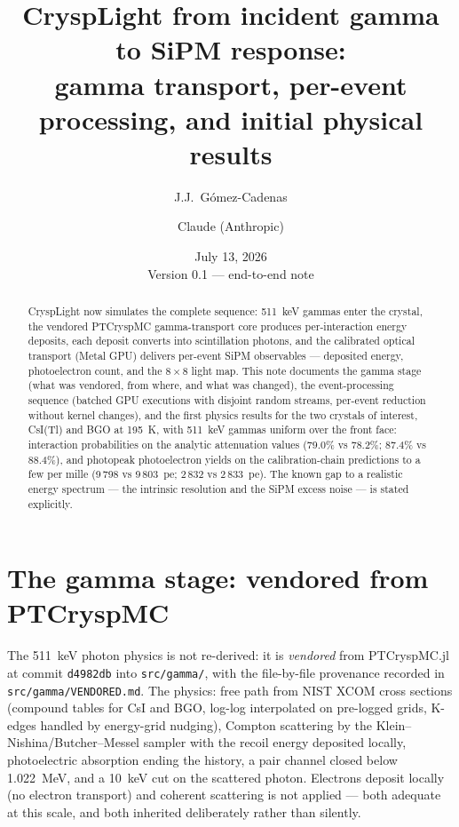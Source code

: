\documentclass[11pt,a4paper]{article}
\title{CryspLight from incident gamma to SiPM response:\\
\large gamma transport, per-event processing, and initial physical results}
\author{J.J.~G\'omez-Cadenas \and Claude (Anthropic)}
\date{July 13, 2026 \\[2mm] \small Version 0.1 --- end-to-end note}
\newcommand{\code}[1]{\texttt{#1}}
\newcommand{\csitl}{CsI(Tl)}
\begin{document}
\maketitle

\begin{abstract}
CryspLight now simulates the complete sequence: 511~keV gammas enter the crystal, the vendored
PTCryspMC gamma-transport core produces per-interaction energy deposits, each deposit
converts into scintillation photons, and the calibrated optical transport (Metal GPU)
delivers per-event SiPM observables --- deposited energy, photoelectron count, and the
$8\times8$ light map. This note documents the gamma stage (what was vendored, from
where, and what was changed), the event-processing sequence (batched GPU executions with
disjoint random streams, per-event reduction without kernel changes), and the first
physics results for the two crystals of interest, \csitl{} and BGO at 195~K, with 511~keV
gammas uniform over the front face: interaction probabilities on the analytic
attenuation values (79.0\% vs 78.2\%; 87.4\% vs 88.4\%), and photopeak photoelectron
yields on the calibration-chain predictions to a few per mille (9\,798 vs 9\,803~pe;
2\,832 vs 2\,833~pe). The known gap to a realistic energy spectrum --- the intrinsic
resolution and the SiPM excess noise --- is stated explicitly.
\end{abstract}

\tableofcontents

\section{The gamma stage: vendored from PTCryspMC}

The 511~keV photon physics is not re-derived: it is \emph{vendored} from
PTCryspMC.jl at commit \code{d4982db} into \code{src/gamma/}, with the file-by-file
provenance recorded in \code{src/gamma/VENDORED.md}. The physics: free path from NIST
XCOM cross sections (compound tables for CsI and BGO, log-log interpolated on
pre-logged grids, K-edges handled by energy-grid nudging), Compton scattering by the
Klein--Nishina/Butcher--Messel sampler with the recoil energy deposited locally,
photoelectric absorption ending the history, a pair channel closed below 1.022~MeV,
and a 10~keV cut on the scattered photon. Electrons deposit locally (no electron
transport) and coherent scattering is not applied --- both adequate at this scale, and
both inherited deliberately rather than silently.
\end{document}
